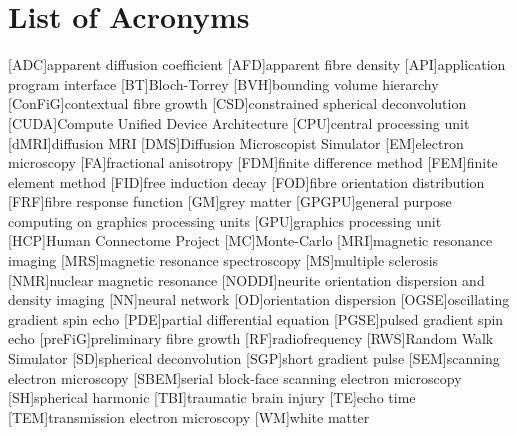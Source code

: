 
\chapter*{List of Acronyms}

\makeatletter
\patchcmd{\AC@@acro}{] #3}{] \MakeUppercase #3}{}{}
\patchcmd{\AC@@acro}{] #3}{] \MakeUppercase #3}{}{}
\makeatother
\begin{acronym}
  [ADC]{apparent diffusion coefficient}
  [AFD]{apparent fibre density}
  [API]{application program interface}
  [BT]{Bloch-Torrey}
  [BVH]{bounding volume hierarchy}
  [ConFiG]{contextual fibre growth}
  [CSD]{constrained spherical deconvolution}
  [CUDA]{Compute Unified Device Architecture}
  [CPU]{central processing unit}
  [dMRI]{diffusion MRI}
  [DMS]{Diffusion Microscopist Simulator}
  [EM]{electron microscopy}
  [FA]{fractional anisotropy}
  [FDM]{finite difference method}
  [FEM]{finite element method}
  [FID]{free induction decay}
  [FOD]{fibre orientation distribution}
  [FRF]{fibre response function}
  [GM]{grey matter}
  [GPGPU]{general purpose computing on graphics processing units}
  [GPU]{graphics processing unit}
  [HCP]{Human Connectome Project}
  [MC]{Monte-Carlo}
  [MRI]{magnetic resonance imaging}
  [MRS]{magnetic resonance spectroscopy}
  [MS]{multiple sclerosis}
  [NMR]{nuclear magnetic resonance}
  [NODDI]{neurite orientation dispersion and density imaging}
  [NN]{neural network}
  [OD]{orientation dispersion}
  [OGSE]{oscillating gradient spin echo}
  [PDE]{partial differential equation}
  [PGSE]{pulsed gradient spin echo}
  [preFiG]{preliminary fibre growth}
  [RF]{radiofrequency}
  [RWS]{Random Walk Simulator}
  [SD]{spherical deconvolution}
  [SGP]{short gradient pulse}
  [SEM]{scanning electron microscopy}
  [SBEM]{serial block-face scanning electron microscopy}
  [SH]{spherical harmonic}
  [TBI]{traumatic brain injury}
  [TE]{echo time}
  [TEM]{transmission electron microscopy}
  [WM]{white matter}
\end{acronym}



